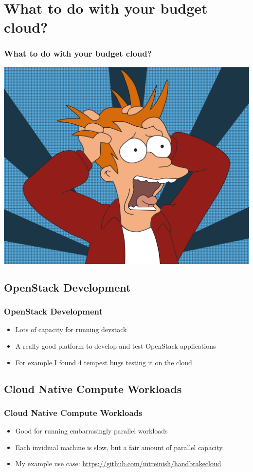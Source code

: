 \documentclass[aspectratio=169,11pt,hyperref={colorlinks=true}]{beamer}
\begin{document}
\section{What to do with your budget cloud?}
\begin{frame}
    \frametitle{What to do with your budget cloud?}
    \centering
    \includegraphics[width=.85\textwidth]{futurama-fry.png}
\end{frame}

\subsection{OpenStack Development}
\begin{frame}
    \frametitle{OpenStack Development}
    \begin{itemize}
        \item Lots of capacity for running devstack
        \item A really good platform to develop and test OpenStack
              applications
        \item For example I found 4 tempest bugs testing it on the cloud
    \end{itemize}
\end{frame}

\subsection{Cloud Native Compute Workloads}
\begin{frame}
        \frametitle{Cloud Native Compute Workloads}
        \begin{itemize}
        \item Good for running embarrasingly parallel workloads
        \item Each invidiual machine is slow, but a fair amount of
            parallel capacity.
        \item My example use case: \href{https://github.com/mtreinish/handbrakecloud}{https://github.com/mtreinish/handbrakecloud}
    \end{itemize}
\end{frame}
\end{document}
